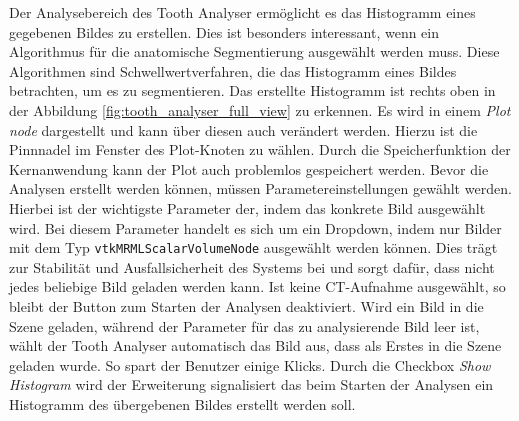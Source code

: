 Der Analysebereich des Tooth Analyser ermöglicht es das Histogramm eines
gegebenen Bildes zu erstellen. Dies ist besonders interessant, wenn ein
Algorithmus für die anatomische Segmentierung ausgewählt werden muss. Diese Algorithmen
sind Schwellwertverfahren, die das Histogramm eines Bildes betrachten, um es zu segmentieren.
Das erstellte Histogramm ist rechts oben in der Abbildung
\ref{fig:tooth_analyser_full_view} zu erkennen. Es wird in einem \textit{Plot
node} dargestellt und kann über diesen auch verändert werden. Hierzu ist die Pinnnadel
im Fenster des Plot-Knoten zu wählen. Durch die Speicherfunktion der
Kernanwendung kann der Plot auch problemlos gespeichert werden. Bevor die Analysen
erstellt werden können, müssen Parametereinstellungen gewählt werden. Hierbei ist
der wichtigste Parameter der, indem das konkrete Bild ausgewählt wird. Bei diesem
Parameter handelt es sich um ein Dropdown, indem nur Bilder mit dem Typ \texttt{vtkMRMLScalarVolumeNode}
ausgewählt werden können. Dies trägt zur Stabilität und Ausfallsicherheit des
Systems bei und sorgt dafür, dass nicht jedes beliebige Bild geladen werden kann.
Ist keine \ac{CT}-Aufnahme ausgewählt, so bleibt der Button zum Starten der
Analysen deaktiviert. Wird ein Bild in die Szene geladen, während der Parameter
für das zu analysierende Bild leer ist, wählt der Tooth Analyser automatisch das
Bild aus, dass als Erstes in die Szene geladen wurde. So spart der Benutzer einige
Klicks. Durch die Checkbox \textit{Show Histogram} wird der Erweiterung signalisiert
das beim Starten der Analysen ein Histogramm des übergebenen Bildes erstellt werden
soll.

